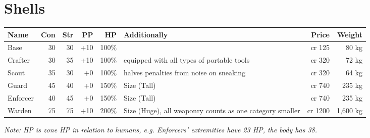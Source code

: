 \documentclass[12pt,a4paper,openany]{book}
\begin{document}
	\section{Shells}
	\begin{tabularx}{\textwidth}{|l|r|r|r|r|X|r|r|}
		\hline
		Name & Con & Str & PP & HP & Additionally & Price & Weight \\ \hline
		Base & 30 & 30 & +10 & 100\% & & cr 125 & 80 kg \\ \hline
		Crafter & 30 & 35 & +10 & 100\% & equipped with all types of portable tools & cr 320 & 72 kg \\ \hline
		Scout & 35 & 30 & +0 & 100\% & halves penalties from noise on sneaking & cr 320 & 64 kg \\ \hline
		Guard & 45 & 40 & +0 & 150\% & Size (Tall) & cr 740 & 235 kg \\ \hline
		Enforcer & 40 & 45 & +0 & 150\% & Size (Tall) & cr 740 & 235 kg \\ \hline
		Warden & 75 & 75 & +10 & 200\% & Size (Huge), all weaponry counts as one category smaller & cr 1200 & 1,600 kg \\ \hline
	\end{tabularx}
	\par \vspace{-8mm}
	\textit{Note: HP is zone HP in relation to humans, e.g. Enforcers' extremities have 23 HP, the body has 38.}
\end{document}
